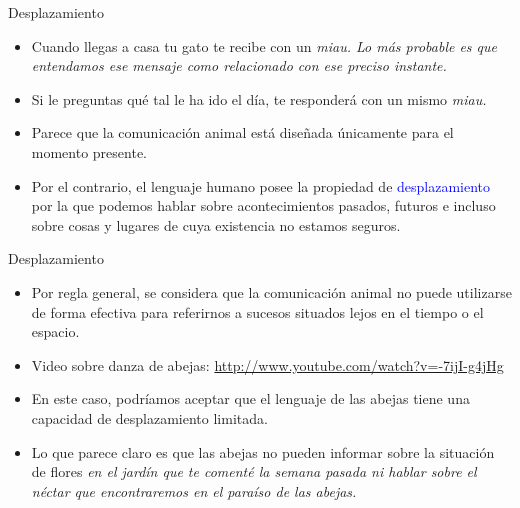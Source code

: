 \documentclass[handout]{beamer}
\begin{document}
\begin{frame}{Desplazamiento}

\begin{itemize}
	\item Cuando llegas a casa tu gato te recibe con un \it{miau}. Lo más probable es que entendamos ese mensaje como relacionado con ese preciso instante. 
	\item Si le preguntas qué tal le ha ido el día, te responderá con un mismo \it{miau}.
	\item Parece que la comunicación animal está diseñada únicamente para el momento presente.
	\item Por el contrario, el lenguaje humano posee la propiedad de \textcolor{blue}{desplazamiento} por la que podemos hablar sobre acontecimientos pasados, futuros e incluso sobre cosas y lugares de cuya existencia no estamos seguros. 
\end{itemize}

\end{frame}

\begin{frame}{Desplazamiento}

\begin{itemize}
	\item Por regla general, se considera que la comunicación animal no puede utilizarse de forma efectiva para referirnos a sucesos situados lejos en el tiempo o el espacio.
	\item Video sobre danza de abejas: \href{http://www.youtube.com/watch?v=-7ijI-g4jHg}{http://www.youtube.com/watch?v=-7ijI-g4jHg}
	\pause
	\item En este caso, podríamos aceptar que el lenguaje de las abejas tiene una capacidad de desplazamiento limitada.
	\item Lo que parece claro es que las abejas no pueden informar sobre la situación de flores \it{en el jardín que te comenté la semana pasada} ni hablar sobre \it{el néctar que encontraremos en el paraíso de las abejas}.
\end{itemize}

\end{frame}
\end{document}
